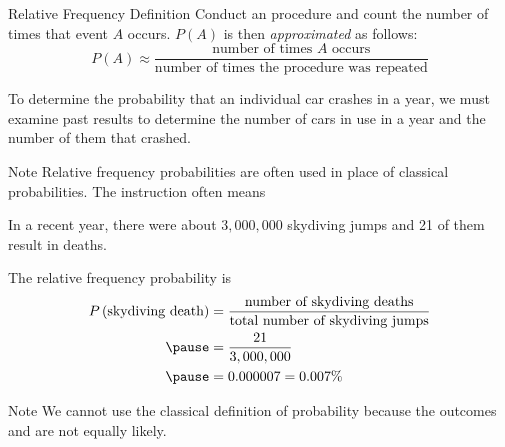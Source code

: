 \documentclass{beamer}
\newcommand{\prob}[1]{P\left(#1\right)}
\begin{document}
\begin{frame}
\begin{block}{Relative Frequency Definition}
Conduct an procedure and count the number of times that event $A$ occurs. $P(A)$ is then \emph{approximated} as follows:
\begin{equation*}
P(A) \approx \dfrac{\text{number of times $A$ occurs}}{\text{number of times the procedure was repeated}}
\end{equation*}
\end{block}\pause

\begin{example}
To determine the probability that an individual car crashes in a year, we must examine past results to determine the number of cars in use in a year and the number of them that crashed. 
\end{example}\pause

\begin{block}{Note}
Relative frequency probabilities are often used in place of classical probabilities. The instruction  often means 
\end{block}
\end{frame}

\begin{frame}
\begin{example}
In a recent year, there were about $3,000,000$ skydiving jumps and 21 of them result in deaths.\pause

\vspace{2mm}
The relative frequency probability is
\begin{equation*}
\begin{aligned}
\prob{\text{skydiving death}}
&=\dfrac{\text{number of skydiving deaths}}{\text{total number of skydiving jumps}} \\\pause
&=\dfrac{21}{3,000,000} \\\pause
&=0.000007 = 0.007\%
\end{aligned}
\end{equation*}
\end{example}\pause

\begin{block}{Note}
We cannot use the classical definition of probability because the outcomes  and  are not equally likely.
\end{block}
\end{frame}
\end{document}
